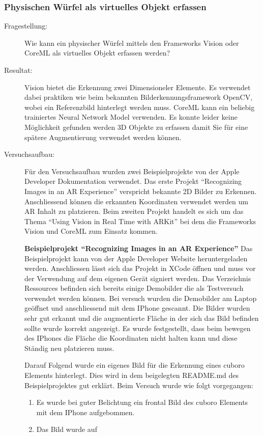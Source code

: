 \subsubsection{Physischen Würfel als virtuelles Objekt erfassen}
\begin{description}
	\item[Fragestellung:] Wie kann ein physischer Würfel mittels den Frameworks Vision oder CoreML als virtuelles Objekt erfassen werden?
	\item[Resultat:] Vision bietet die Erkennung zwei Dimensioneler Elemente. Es verwendet dabei praktiken wie beim bekannten Bilderkennungsframework OpenCV, wobei ein Referenzbild hinterlegt werden muss. CoreML kann ein beliebig trainiertes Neural Network Model verwenden. Es konnte leider keine Möglichkeit gefunden werden 3D Objekte zu erfassen damit Sie für eine spätere Augmentierung verwendet werden können. 
	\item[Versuchsaufbau:] Für den Versuchsaufbau wurden zwei Beispielprojekte von der Apple Developer Dokumentation verwendet. Das erste Projekt "`Recognizing Images in an AR Experience"' \cite{arkit-recognize-images} verspricht bekannte 2D Bilder zu Erkennen. Anschliessend können die erkannten Koordinaten verwendet werden um AR Inhalt zu platzieren.
	Beim zweiten Projekt handelt es sich um das Thema "`Using Vision in Real Time with ARKit"' \cite{vision-real-time-with-arkit} bei dem die Frameworks Vision und CoreML zum Einsatz kommen.

	\textbf{Beispielprojekt "`Recognizing Images in an AR Experience"'}
	Das Beispielprojekt kann von der Apple Developer Website heruntergeladen werden. Anschliessen lässt sich das Projekt in XCode öffnen und muss vor der Verwendung auf dem eigenen Gerät signiert werden. Das Verzeichnis Ressources befinden sich bereits einige Demobilder die als Testversuch verwendet werden können. Bei versuch wurden die Demobilder am Laptop geöffnet und anschliessend mit dem IPhone gescannt. Die Bilder wurden sehr gut erkannt und die augmentierte Fläche in der sich das Bild befinden sollte wurde korrekt angezeigt. Es wurde festgestellt, dass beim bewegen des IPhones die Fläche die Koordinaten nicht halten kann und diese Ständig neu platzieren muss.

	Darauf Folgend wurde ein eigenes Bild für die Erkennung eines cuboro Elements hinterlegt. Dies wird in dem beigelegten README.md des Beispielprojektes gut erklärt. Beim Versuch wurde wie folgt vorgegangen: 

	\begin{enumerate}
		\item Es wurde bei guter Belichtung ein frontal Bild des cuboro Elements mit dem IPhone aufgebommen. 
		\item Das Bild wurde auf  
		\end{enumerate}

\end{description}
